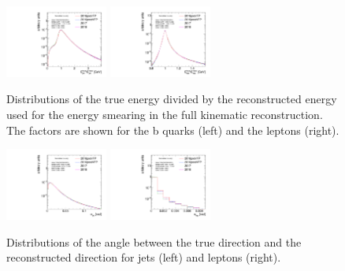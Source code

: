 \begin{figure}[htb]
    \begin{center}
        \includegraphics[width=0.30\textwidth]{fig_fullRun2UL/SmearingPlots/ULcomp_KinReco_fE_jet_step7.pdf}
        \includegraphics[width=0.30\textwidth]{fig_fullRun2UL/SmearingPlots/ULcomp_KinReco_fE_lep_step7.pdf}
        \caption{\small Distributions of the true energy divided by the reconstructed energy used for the energy smearing in the \ttbar full kinematic reconstruction. 
        The factors are shown for the b quarks (left) and the leptons (right).}
    \label{fig:energyFactor}
    \end{center}
\end{figure}

\begin{figure}[htb]
    \begin{center}
        \includegraphics[width=0.30\textwidth]{fig_fullRun2UL/SmearingPlots/ULcomp_KinReco_d_angle_jet_step7.pdf}
        \includegraphics[width=0.30\textwidth]{fig_fullRun2UL/SmearingPlots/ULcomp_KinReco_d_angle_lep_step7.pdf}
        \caption{\small Distributions of the angle between the true direction and the reconstructed direction for jets (left) and leptons (right).}
       \label{fig:angleFactor}
    \end{center}
\end{figure}

